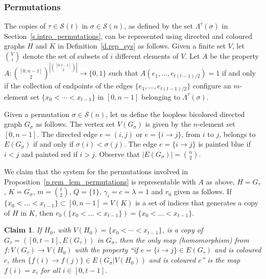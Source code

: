 \documentclass[10pt]{article}
\newtheorem{claim}{Claim}
\begin{document}
\subsubsection{Permutations}\label{s.perm_rep_and_rem_lem}






The copies of $\tau\in \mathcal{S}(t)$ in $\sigma\in \mathcal{S}(n)$, as defined by the set $\Lambda^{\tau}(\sigma)$ in Section~\ref{s.intro_permutations}, can be represented using directed and coloured graphs $H$ and $K$ in Definition~\ref{d.rep_sys} as follows.
Given a finite set $V$, let ${V\choose i}$ denote the set of subsets of $i$ different elements of $V$. Let $A$ be the property
$A:{[0,n-1]\choose 2}^{\left|{[0,t-1] \choose 2}\right|} \to \{0,1\}$
such that $A(e_1,\ldots,e_{t(t-1)/2})=1$ if and only if 
the collection of endpoints of the edges $\{e_1,\ldots,e_{t(t-1)/2}\}$ configure an $m$-element set $\{x_0<\cdots<x_{t-1}\}$ in $[0,n-1]$ belonging to $\Lambda^{\tau}(\sigma)$.

Given a permutation $\sigma\in \mathcal{S}(n)$, let us define the loopless bicolored directed graph $G_{\sigma}$
as follows. The vertex set $V(G_{\sigma})$ is given by the $n$-element set $[0,n-1]$. The directed edge $e=(i,j)$ or $e=\{i\to j\}$, from $i$ to $j$, belongs to $E(G_{\sigma})$ if and only if $\sigma(i)<\sigma(j)$.
The edge $e=\{i\to j\}$ is painted blue if $i<j$ and painted red if $i>j$.
Observe that $|E(G_{\sigma})|={n \choose 2}$.

We claim that the system for the permutations involved in Proposition~\ref{p.rem_lem_permutations} is representable with $A$ as above, $H=G_{\tau}$, $K=G_{\sigma}$, $m={t \choose 2}$, $Q=\{1\}$, $\gamma_i=c=\lambda=1$ and $r_0$ given as follows.
If $\{x_0<\ldots<x_{t-1}\}\subset [0,n-1]=V(K)$ is a set of indices that generates a copy of $H$ in $K$, then $r_0(\{x_0<\ldots<x_{t-1}\})=\{x_0<\ldots<x_{t-1}\}$.

\begin{claim}\label{cl.0}
	If $H_0$, with $V(H_0)=\{x_0<\cdots<x_{t-1}\}$, is a copy of $G_{\tau}=([0,t-1],E(G_{\tau}))$
in $G_{\sigma}$, then the only map (homomorphism) from $f:V(G_{\tau}) \to V(H_0)$
with the property ``if $e=\{i\to j\}\in E(G_{\tau})$ and is coloured $c$, then
$\{f(i)\to f(j)\}\in E(G_{\sigma}{|V(H_0)})$ and is coloured $c$'' is the map
$f(i)=x_i$ for all $i\in [0,t-1]$.
\end{claim}
\end{document}
